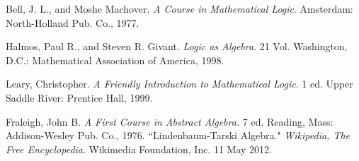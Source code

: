 \documentclass[11pt,titlepage]{article}
\theoremstyle{definition}
\begin{document}











\newpage
\begin{thebibliography}{99}
 Bell, J. L., and Moshe Machover. {\em A Course in Mathematical Logic}. Amsterdam: North-Holland Pub. Co., 1977.

 Halmos, Paul R., and Steven R. Givant. {\em Logic as Algebra}. 21 Vol. Washington, D.C.: Mathematical Association of America, 1998.

 Leary, Christopher. {\em A Friendly Introduction to Mathematical Logic}. 1 ed. Upper Saddle River: Prentice Hall, 1999.

 Fraleigh, John B. {\em A First Course in Abstract Algebra.} 7 ed. Reading, Mass: Addison-Wesley Pub. Co., 1976.
 ``Lindenbaum-Tarski Algebra." {\em Wikipedia, The Free Encyclopedia}. Wikimedia Foundation, Inc. 11 May 2012.
\end{thebibliography}
\end{document}
